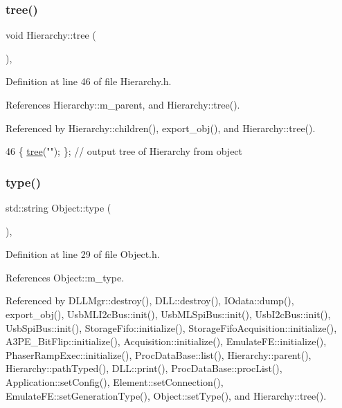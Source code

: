 \subsubsection{\texorpdfstring{tree()}{tree()}\hspace{0.1cm}{\footnotesize\ttfamily [2/2]}}
{\footnotesize\ttfamily void Hierarchy\+::tree (\begin{DoxyParamCaption}{ }\end{DoxyParamCaption})\hspace{0.3cm}{\ttfamily [inline]}, {\ttfamily [inherited]}}



Definition at line 46 of file Hierarchy.\+h.



References Hierarchy\+::m\+\_\+parent, and Hierarchy\+::tree().



Referenced by Hierarchy\+::children(), export\+\_\+obj(), and Hierarchy\+::tree().


\begin{DoxyCode}
46 \{ \hyperlink{classHierarchy_a594c294c5f60c230e106d522ed008212}{tree}(\textcolor{stringliteral}{""}); \};                     \textcolor{comment}{// output tree of Hierarchy from object}
\end{DoxyCode}
\mbox{\label{classObject_a84f99f70f144a83e1582d1d0f84e4e62}} 
\subsubsection{\texorpdfstring{type()}{type()}}
{\footnotesize\ttfamily std\+::string Object\+::type (\begin{DoxyParamCaption}{ }\end{DoxyParamCaption})\hspace{0.3cm}{\ttfamily [inline]}, {\ttfamily [inherited]}}



Definition at line 29 of file Object.\+h.



References Object\+::m\+\_\+type.



Referenced by D\+L\+L\+Mgr\+::destroy(), D\+L\+L\+::destroy(), I\+Odata\+::dump(), export\+\_\+obj(), Usb\+M\+L\+I2c\+Bus\+::init(), Usb\+M\+L\+Spi\+Bus\+::init(), Usb\+I2c\+Bus\+::init(), Usb\+Spi\+Bus\+::init(), Storage\+Fifo\+::initialize(), Storage\+Fifo\+Acquisition\+::initialize(), A3\+P\+E\+\_\+\+Bit\+Flip\+::initialize(), Acquisition\+::initialize(), Emulate\+F\+E\+::initialize(), Phaser\+Ramp\+Exec\+::initialize(), Proc\+Data\+Base\+::list(), Hierarchy\+::parent(), Hierarchy\+::path\+Typed(), D\+L\+L\+::print(), Proc\+Data\+Base\+::proc\+List(), Application\+::set\+Config(), Element\+::set\+Connection(), Emulate\+F\+E\+::set\+Generation\+Type(), Object\+::set\+Type(), and Hierarchy\+::tree().


